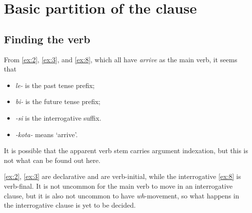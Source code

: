\documentclass{article}
\newcommand*{\term}[1]{\emph{#1}}
\newcommand*{\corpus}[1]{\emph{#1}}
\begin{document}
\section{Basic partition of the clause}\label{sec:clause-partition}

\subsection{Finding the verb}

From \eqref{ex:2}, \eqref{ex:3}, and \eqref{ex:8}, which all have \corpus{arrive} as the main verb,
it seems that 
\begin{itemize}
    \item \corpus{le-} is the past tense prefix;
    \item \corpus{bi-} is the future tense prefix;
    \item \corpus{-si} is the interrogative suffix.
    \item \corpus{-kota-} means `arrive'.
\end{itemize}
It is possible that the apparent verb stem carries argument indexation,
but this is not what can be found out here.

\eqref{ex:2}, \eqref{ex:3} are declarative and are verb-initial,
while the interrogative \eqref{ex:8} is verb-final.
It is not uncommon for the main verb to move in an interrogative clause,
but it is also not uncommon to have \term{wh}-movement,
so what happens in the interrogative clause is yet to be decided.
\end{document}
